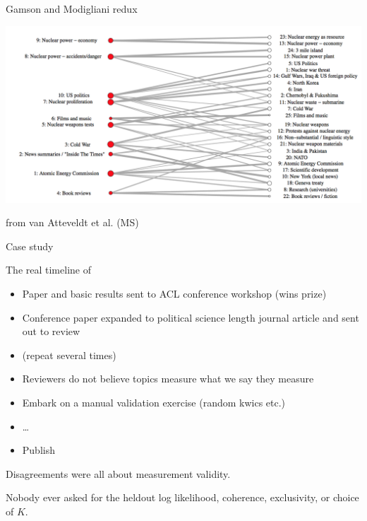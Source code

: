 \documentclass{hertieteaching}
\begin{document}
\begin{frame}{Gamson and Modigliani redux}

\centerline{\includegraphics[scale=0.45]{pictures/nested-topics-nuclear}}

from van Atteveldt et al. (MS)


\end{frame}

\begin{frame}{Case study}

The real timeline of \textcite{Baerg.Lowe2020}

\begin{itemize}
  \item Paper and basic results sent to ACL conference workshop (wins prize)
  \item Conference paper expanded to political science length journal article and sent out to review
  \item (repeat several times)
  \item Reviewers do not believe topics measure what we say they measure
  \item Embark on a manual validation exercise (random kwics etc.)
  \item \ldots
  \item Publish
\end{itemize}

Disagreements were all about measurement validity.

Nobody ever asked for the heldout log likelihood, coherence, exclusivity, or choice of $K$.

\end{frame}
\end{document}
